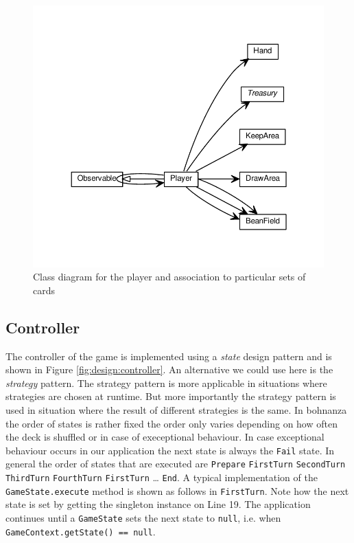 \begin{figure}[h!] 
    \includegraphics[width=\textwidth]{../umlgraph/PlayerGraph}
    \caption{Class diagram for the player and association to particular sets of cards}
    \label{fig:design:player}
\end{figure}

\newpage
\subsection{Controller}
The controller of the game is implemented using a \emph{state} design pattern and is shown in Figure
\ref{fig:design:controller}. An alternative we could use here is the \emph{strategy} pattern. The strategy pattern is more applicable in
situations where strategies are chosen at runtime. But more importantly the strategy pattern is used in situation where the result of
different strategies is the same. In bohnanza the order of states is rather fixed the order only varies depending on how often the deck is
shuffled or in case of execeptional behaviour. In case exceptional behaviour occurs in our application the next state is always the
\texttt{Fail} state. In general the order of states that are executed are \texttt{Prepare} \textrightarrow{} \texttt{FirstTurn}
\textrightarrow{} \texttt{SecondTurn} \textrightarrow{} \texttt{ThirdTurn} \textrightarrow{} \texttt{FourthTurn} \textrightarrow{}
\texttt{FirstTurn} \textrightarrow{} \ldots \textrightarrow{} \texttt{End}. A typical implementation of the \texttt{GameState.execute}
method is shown as follows in \texttt{FirstTurn}. Note how the next state is set by getting the singleton instance on Line 19. The
application continues until a \texttt{GameState} sets the next state to \texttt{null}, i.e. when \texttt{GameContext.getState() == null}.

